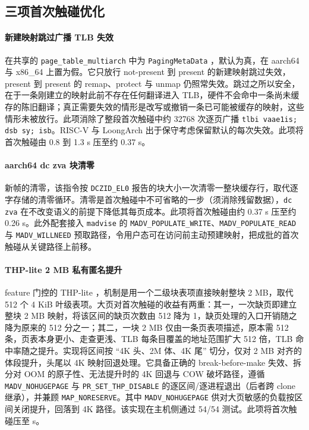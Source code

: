 \subsection{三项首次触碰优化}

\paragraph{新建映射跳过广播 TLB 失效}
在共享的 \texttt{page\_table\_multiarch} 中为 \texttt{PagingMetaData} ，默认为真，在 aarch64 与 x86\_64 上置为假。它只放行 not-present 到 present 的新建映射跳过失效，present 到 present 的 remap、protect 与 unmap 仍照常失效。跳过之所以安全，在于一条刚建立的映射此前不存在任何翻译进入 TLB，硬件不会命中一条尚未缓存的陈旧翻译；真正需要失效的情形是改写或撤销一条已可能被缓存的映射，这些情形未被放行。此项消除了整段首次触碰中约 32768 次逐页广播 \texttt{tlbi vaae1is; dsb sy; isb}。RISC-V 与 LoongArch 出于保守考虑保留默认的每次失效。此项将首次触碰由 0.8 到 1.3 s 压至约 0.37 s。

\paragraph{aarch64 dc zva 块清零}
新帧的清零，该指令按 \texttt{DCZID\_EL0} 报告的块大小一次清零一整块缓存行，取代逐字存储的清零循环。清零是首次触碰中不可省略的一步（须消除残留数据），\texttt{dc zva} 在不改变语义的前提下降低其每页成本。此项将首次触碰由约 0.37 s 压至约 0.26 s。此外配套接入 \texttt{madvise} 的 \texttt{MADV\_POPULATE\_WRITE}、\texttt{MADV\_POPULATE\_READ} 与 \texttt{MADV\_WILLNEED} 预取路径，令用户态可在访问前主动预建映射，把成批的首次触碰从关键路径上前移。

\paragraph{THP-lite 2 MB 私有匿名提升}
feature 门控的 THP-lite ，机制是用一个二级块表项直接映射整块 2 MB，取代 512 个 4 KiB 叶级表项。大页对首次触碰的收益有两重：其一，一次缺页即建立整块 2 MB 映射，将该区间的缺页次数由 512 降为 1，缺页处理的入口开销随之降为原来的 512 分之一；其二，一块 2 MB 仅由一条页表项描述，原本需 512 条，页表本身更小、走查更浅、TLB 每条目覆盖的地址范围扩大 512 倍，TLB 命中率随之提升。实现将区间按 “4K 头、2M 体、4K 尾” 切分，仅对 2 MB 对齐的体段提升，头尾以 4K 映射回退处理。它具备正确的 break-before-make 失效、拆分对 OOM 的原子性、无法提升时的 4K 回退与 COW 破坏路径，遵循 \texttt{MADV\_NOHUGEPAGE} 与 \texttt{PR\_SET\_THP\_DISABLE} 的逐区间/逐进程退出（后者跨 clone 继承），并兼顾 \texttt{MAP\_NORESERVE}。其中 \texttt{MADV\_NOHUGEPAGE} 供对大页敏感的负载按区间关闭提升，回落到 4K 路径。该实现在主机侧通过 54/54 测试。此项将首次触碰压至 \nThpFT{} s。

